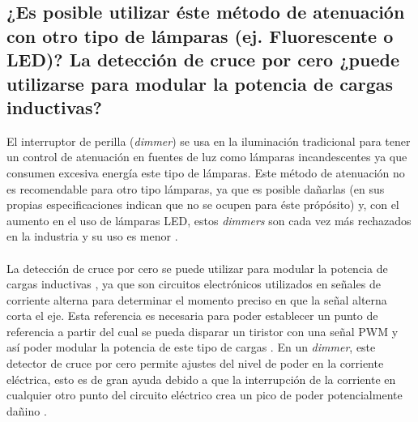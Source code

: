 \documentclass[letterpaper,10.5pt]{article} %
\begin{document}
	\subsection{¿Es posible utilizar éste método de atenuación con otro tipo de lámparas (ej. Fluorescente o LED)? La detección de cruce por cero ¿puede utilizarse para modular la potencia de cargas inductivas?}
	El interruptor de perilla (\emph{dimmer}) se usa en la iluminación tradicional para tener un control de atenuación en fuentes de luz como lámparas incandescentes ya que consumen excesiva energía este tipo de lámparas. Este método de atenuación no es recomendable para otro tipo lámparas, ya que es posible dañarlas (en sus propias especificaciones indican que no se ocupen para éste própósito) y, con el aumento en el uso de lámparas LED, estos \emph{dimmers} son cada vez más rechazados en la industria y su uso es menor \cite{espinel2018modelacion}.\\ \\
	La detección de cruce por cero se puede utilizar para modular la potencia de cargas inductivas \cite{lemus2015diseno}, ya que son circuitos electrónicos utilizados en señales de corriente alterna para determinar el momento preciso en que la señal alterna corta el eje. Esta referencia es necesaria para poder establecer un punto de referencia a partir del cual se pueda disparar un tiristor con una señal PWM y así poder modular la potencia de este tipo de cargas \cite{revista}.	En un \emph{dimmer}, este detector de cruce por cero permite ajustes del nivel de poder en la corriente eléctrica, esto es de gran ayuda debido a que la interrupción de la corriente en cualquier otro punto del circuito eléctrico crea un pico de poder potencialmente dañino \cite{pagina_web}.
	\hfill \break %
	
\end{document}
